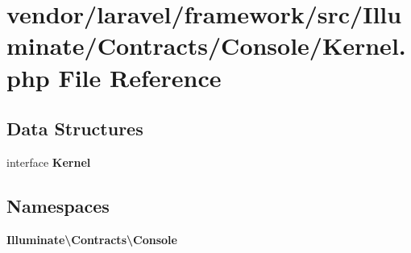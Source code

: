 \section{vendor/laravel/framework/src/\+Illuminate/\+Contracts/\+Console/\+Kernel.php File Reference}
\label{vendor_2laravel_2framework_2src_2_illuminate_2_contracts_2_console_2_kernel_8php}
\subsection*{Data Structures}
\begin{DoxyCompactItemize}
\item 
interface {\bf Kernel}
\end{DoxyCompactItemize}
\subsection*{Namespaces}
\begin{DoxyCompactItemize}
\item 
 {\bf Illuminate\textbackslash{}\+Contracts\textbackslash{}\+Console}
\end{DoxyCompactItemize}
